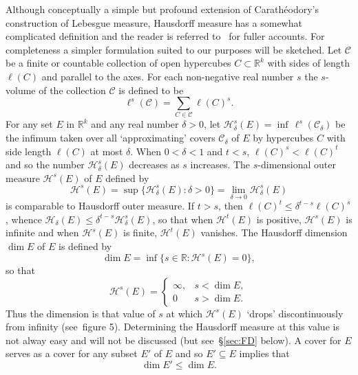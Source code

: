 \documentclass[reqno]{amsart}
\renewcommand{\le}{\leqslant}
\newcommand{\R}{{\mathbb{R}}}
\newcommand{\0}{{\mathbf{0}}}
\newcommand{\col}{\colon}
\newcommand{\HM}{Hausdorff measure}
\newcommand{\cC}{\mathcal{C}}
\newcommand{\cH}{\mathcal{H}}
\begin{document}
Although conceptually a simple but profound extension of
Carath\'eodory's construction of Lebesgue measure, Hausdorff measure has
a somewhat complicated definition and the reader is referred
to~\cite{MDAMshort,FalcGFSshort,FalcFG,Fed,MattilaGS,Rogers} for
fuller accounts.  For completeness a simpler formulation suited to our
purposes will be sketched.  Let $\mathcal C$ be a finite or countable
collection of open hypercubes $C \subset \R^k$ with sides of length
$\ell(C)$ and parallel to the axes.  For each non-negative real number
$s$ the $s$-volume of the collection $\cC$ is defined to be
$$
\ell^s(\mathcal C) = \sum_{C\in \mathcal C} \ell(C)^s.
$$ 
For any set $E$ in $\R^k$ and any real number $\delta>0$, let
$\cH_{\delta} ^s(E) = \inf \, \ell^s(\mathcal C_{\delta})$ be the
infimum taken over all `approximating' covers $\mathcal C_{\delta}$ of
$E$ by hypercubes $C$ with side length $\ell(C)$ at most $\delta$.  When $0
< \delta < 1$ and $t < s$, $\ell(C)^s < \ell(C)^t$ and so the number
$\cH_{\delta} ^s(E)$ decreases as $s$ increases.  The $s$-dimensional
outer measure $\cH^s(E)$ of $E$ defined by
$$
\cH^s(E) = \sup \{\cH_{\delta}^s(E) \col \delta > 0\} =\lim_{\delta\to
  0} \cH_{\delta}^s(E)
$$
is comparable to Hausdorff outer measure.  
If $t>s$, then $\ell(C)^t \le \delta^{t-s} \ell(C)^s$,   
whence
$\cH_{\delta}(E) \le \delta^{t-s} \cH_{\delta}^s(E)$, so that when 
$\cH^t(E)$ is positive, $\cH^s(E)$ is infinite and when $\cH^s(E)$
is finite, $\cH^t(E)$ vanishes.  The Hausdorff dimension $\dim E$ of $E$ is 
defined by
$$
\dim E = \inf \{s \in \R \col \cH^s(E) = 0 \},
$$
so that
\begin{equation*}
\cH^s(E) =   \begin{cases}  \infty, & s < \dim E, \\
                   0     & s > \dim E. 
  \end{cases}
  \end{equation*}
  Thus the dimension is that value of $s$ at which $\cH^s(E)$ `drops'
  discontinuously from infinity (see~figure 5).  Determining the \HM{}
  at this value is not alway easy and will not be discussed (but
  see~\S\ref{sec:FD} below). A cover for $E$ serves as a cover for any subset
  $E'$ of $E$ and so $E' \subseteq E$ implies that
$$
\dim E' \le \dim E.
$$  
  
\end{document}
